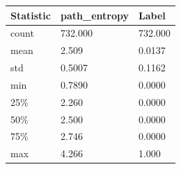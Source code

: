 \begin{tabular}{lll}
\toprule
Statistic & path\_entropy & Label \\
\midrule
count & 732.000 & 732.000 \\
mean & 2.509 & 0.0137 \\
std & 0.5007 & 0.1162 \\
min & 0.7890 & 0.0000 \\
25\% & 2.260 & 0.0000 \\
50\% & 2.500 & 0.0000 \\
75\% & 2.746 & 0.0000 \\
max & 4.266 & 1.000 \\
\bottomrule
\end{tabular}